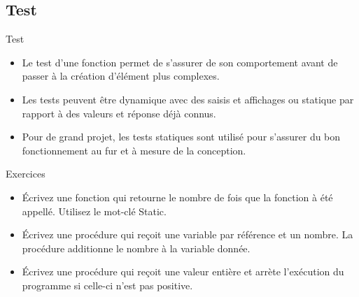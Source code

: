 \documentclass[aspectratio=169,usenames,dvipsnames]{beamer}
\begin{document}
    \subsection{Test}
    \begin{frame}{Test}
        \begin{itemize}
            \item Le test d'une fonction permet de s'assurer de son comportement avant de passer à la création d'élément plus complexes.
            \item Les tests peuvent être dynamique avec des saisis et affichages ou statique par rapport à des valeurs et réponse déjà connus.
            \item Pour de grand projet, les tests statiques sont utilisé pour s'assurer du bon fonctionnement au fur et à mesure de la conception.
        \end{itemize}
    \end{frame}
    \begin{frame}{Exercices}
        \begin{itemize}
            \item Écrivez une fonction qui retourne le nombre de fois que la fonction à été appellé. Utilisez le mot-clé Static.
            \item Écrivez une procédure qui reçoit une variable par référence et un nombre. La procédure additionne le nombre à la variable donnée.
            \item Écrivez une procédure qui reçoit une valeur entière et arrète l'exécution du programme si celle-ci n'est pas positive.
        \end{itemize}
    \end{frame}
\end{document}
